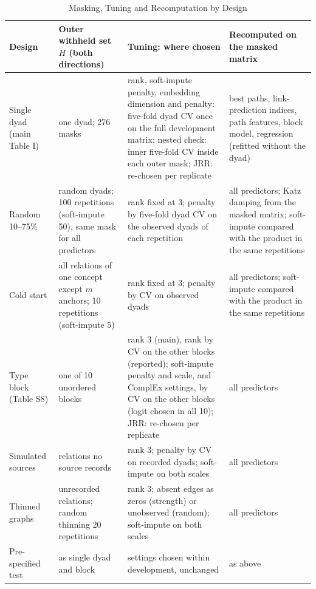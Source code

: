 \documentclass[journal]{IEEEtran}
\begin{document}
\setcounter{table}{6}\begin{table}[!t]
\caption{Masking, Tuning and Recomputation by Design}
\centering
\scriptsize
\setlength{\tabcolsep}{3pt}
\begin{tabular}{@{}p{2.4cm}p{3.4cm}p{5.6cm}p{4.6cm}@{}}
\toprule
Design & Outer withheld set $H$ (both directions) & Tuning: where chosen & Recomputed on the masked matrix\\
\midrule
Single dyad (main Table I) & one dyad; 276 masks & rank, soft-impute penalty, embedding dimension and penalty: five-fold dyad CV once on the full development matrix; nested check: inner five-fold CV inside each outer mask; JRR: re-chosen per replicate & best paths, link-prediction indices, path features, block model, regression (refitted without the dyad) \\
Random 10--75\% & random dyads; 100 repetitions (soft-impute 50), same mask for all predictors & rank fixed at 3; penalty by five-fold dyad CV on the observed dyads of each repetition & all predictors; Katz damping from the masked matrix; soft-impute compared with the product in the same repetitions\\
Cold start & all relations of one concept except $m$ anchors; 10 repetitions (soft-impute 5) & rank fixed at 3; penalty by CV on observed dyads & all predictors; soft-impute compared with the product in the same repetitions\\
Type block (Table S8) & one of 10 unordered blocks & rank 3 (main), rank by CV on the other blocks (reported); soft-impute penalty and scale, and ComplEx settings, by CV on the other blocks (logit chosen in all 10); JRR: re-chosen per replicate & all predictors\\
Simulated sources & relations no source records & rank 3; penalty by CV on recorded dyads; soft-impute on both scales & all predictors\\
Thinned graphs & unrecorded relations; random thinning 20 repetitions & rank 3; absent edges as zeros (strength) or unobserved (random); soft-impute on both scales & all predictors\\
Pre-specified test & as single dyad and block & settings chosen within development, unchanged & as above\\
\bottomrule
\end{tabular}
\end{table}
\end{document}
